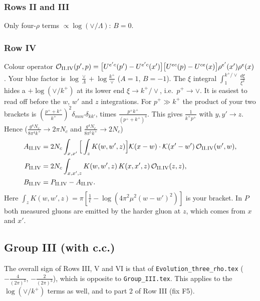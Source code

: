 \documentclass[10pt]{article}
\numberwithin{equation}{section}
\newcommand{\KK}{\mathcal K}
\newcommand{\kp}{k^+}
\newcommand{\pp}{p^+}
\begin{document}
\subsubsection{Rows II and III}
Only four-$\rho$ terms $\propto\log(\vee/\Lambda)$: \textbf{$B=0$}.

\subsubsection{Row IV}\label{B:sec:II.IV}
Colour operator $\mathcal O_{\rm II.IV}(p',p)=\big[U^{e'c}(p')-U^{e'c}(x')\big]\big[U^{ec}(p)-U^{ce}(x)\big]\rho^{e'}(x')\rho^e(x)$. Your blue factor is $\log\frac{\vee}{\Lambda}+\log\frac{k^+}{\vee}$ ($A=1$, $B=-1$). The $\xi$ integral $\int_1^{k^+/\vee}\frac{d\xi}{\xi^2}$ hides a $+\log(\vee/k^+)$ at its lower end $\xi\to k^+/\vee$, i.e.\ $\pp\to\vee$. It is easiest to read off before the $w$, $w'$ and $z$ integrations. For $\pp\gg\kp$ the product of your two brackets is $(\frac{\pp+\kp}{\kp})^2\delta_{mm'}\delta_{kk'}$, times $\frac{\pp\kp}{(\pp+\kp)^4}$. This gives $\frac{1}{\kp\pp}$ with $y,y'\to z$. Hence ($\frac{g^4N_c}{8\pi^4k^+}\to2\pi N_c$ and $\frac{g^4N_c}{8\pi^5k^+}\to2N_c$)
\begin{align}
A_{\rm II.IV}&=2N_c\int_{x,x'}\Big[\int_zK(w,w',z)\Big]\KK(x-w)\cdot\KK(x'-w')\,\mathcal O_{\rm II.IV}(w',w),\notag\\
P_{\rm II.IV}&=2N_c\int_{x,x',z}K(w,w',z)\,K(x,x',z)\,\mathcal O_{\rm II.IV}(z,z),\notag\\
B_{\rm II.IV}&=P_{\rm II.IV}-A_{\rm II.IV}.
\end{align}
Here $\int_zK(w,w',z)=\pi[\frac1{\bar\epsilon}-\log(4\pi^2\mu^2(w-w')^2)]$ is your bracket. In $P$ both measured gluons are emitted by the harder gluon at $z$, which comes from $x$ and $x'$.

\subsection{Group III (with c.c.)}
The overall sign of Rows III, V and VI is that of \texttt{Evolution\_three\_rho.tex} ($-\frac{4}{(2\pi)^3}$, $-\frac{2}{(2\pi)^3}$), which is opposite to \texttt{Group\_III.tex}. This applies to the $\log(\vee/k^+)$ terms as well, and to part 2 of Row III (fix F5).
\end{document}
